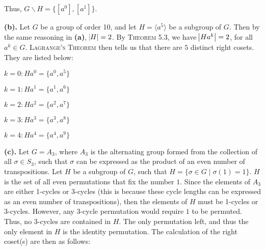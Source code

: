 \documentclass[12pt, a4paper]{article}
\begin{document}
\vspace{8mm}

Thus, $G\backslash H=\{[a^0], [a^1]\}$.

\newpage

\textbf{(b). }Let $G$ be a group of order 10, and let $H=\langle a^5\rangle$ be a subgroup of $G$. Then by the same reasoning in \textbf{(a)}, $\abs{H}=2$. By \textsc{Theorem 5.3}, we have $\abs{Ha^k}=2$, for all $a^k\in G$. \textsc{Lagrange's Theorem} then tells us that there are $5$ distinct right cosets. They are listed below:\par

\vspace{4mm}

\begin{description}
\item{$k=0 : $}\hspace{1mm}$Ha^0=\{a^0, a^5\}$
\item{$k=1 : $}\hspace{1mm}$Ha^1=\{a^1, a^6\}$
\item{$k=2 : $}\hspace{1mm}$Ha^2=\{a^2, a^7\}$
\item{$k=3 : $}\hspace{1mm}$Ha^3=\{a^3, a^8\}$
\item{$k=4 : $}\hspace{1mm}$Ha^4=\{a^4, a^9\}$
\end{description}

\vspace{8mm}

\textbf{(c). }Let $G=A_3$, where $A_3$ is the alternating group formed from the collection of all $\sigma\in S_3$, such that $\sigma$ can be expressed as the product of an even number of transpositions. Let $H$ be a subgroup of $G$, such that $H=\{\sigma\in G\mid \sigma(1)=1\}$. $H$ is the set of all even permutations that fix the number $1$. Since the elements of $A_3$ are either 1-cycles or 3-cycles (this is because these cycle lengths can be expressed as an even number of transpositions), then the elements of $H$ must be 1-cycles or 3-cycles. However, any 3-cycle permutation would require $1$ to be permuted. Thus, no 3-cycles are contained in $H$. The only permutation left, and thus the only element in $H$ is the identity permutation. The calculation of the right coset(s) are then as follows:\par

\vspace{4mm}
\end{document}
